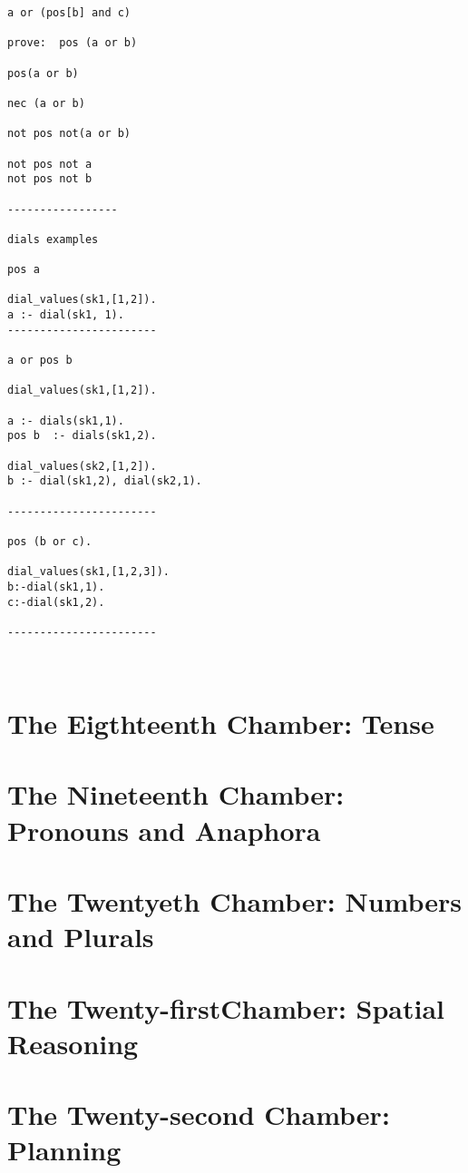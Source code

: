 \documentclass{book}[9pt]
\begin{document}
\begin{verbatim}
a or (pos[b] and c)

prove:  pos (a or b) 

pos(a or b) 

nec (a or b)

not pos not(a or b)

not pos not a 
not pos not b 

-----------------

dials examples

pos a

dial_values(sk1,[1,2]).
a :- dial(sk1, 1).
-----------------------

a or pos b

dial_values(sk1,[1,2]).

a :- dials(sk1,1).
pos b  :- dials(sk1,2).

dial_values(sk2,[1,2]).
b :- dial(sk1,2), dial(sk2,1).

-----------------------

pos (b or c).

dial_values(sk1,[1,2,3]).
b:-dial(sk1,1).
c:-dial(sk1,2).

-----------------------



\end{verbatim}


\chapter{The Eigthteenth Chamber: Tense}

\chapter{The Nineteenth  Chamber: Pronouns and Anaphora}

\chapter{The Twentyeth Chamber: Numbers and Plurals}

\chapter{The Twenty-firstChamber: Spatial Reasoning}

\chapter{The Twenty-second Chamber: Planning}
\end{document}
